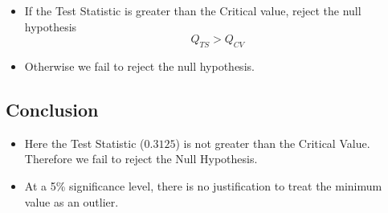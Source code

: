 \documentclass[a4paper,12pt]{article}
\begin{document}
\begin{itemize}
    \item 
 If the Test Statistic is greater than the Critical value, reject the null hypothesis
\[ Q_{TS} > Q_{CV}\]

\item  Otherwise we fail to reject the null hypothesis.
\end{itemize}
\subsection*{Conclusion}

\begin{itemize}
\item Here the Test Statistic ($0.3125$) is not greater than the Critical Value. Therefore we fail to reject the Null Hypothesis. 

\item At a 5\% significance level, there is no justification to treat the minimum value as an outlier.
\end{itemize}
\end{document}
